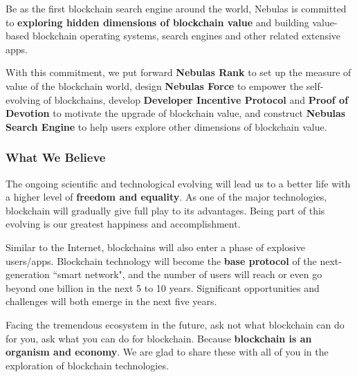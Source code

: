 Be as the first blockchain search engine around the world, Nebulas is committed to \textbf{exploring hidden dimensions of blockchain value} and building value-based blockchain operating systems, search engines and other related extensive apps.

With this commitment, we put forward \textbf{Nebulas Rank} to set up the measure of value of the blockchain world, design \textbf{Nebulas Force} to empower the self-evolving of blockchains, develop \textbf{Developer Incentive Protocol} and \textbf{Proof of Devotion} to motivate the upgrade of blockchain value, and construct \textbf{Nebulas Search Engine} to help users explore other dimensions of blockchain value.

\subsubsection*{What We Believe}

The ongoing scientific and technological evolving will lead us to a better life with a higher level of \textbf{freedom and equality}. As one of the major technologies, blockchain will gradually give full play to its advantages. Being part of this evolving is our greatest happiness and accomplishment.

Similar to the Internet, blockchains will also enter a phase of explosive users/apps. Blockchain technology will become the \textbf{base protocol} of the next-generation ``smart network", and the number of users will reach or even go beyond one billion in the next 5 to 10 years. Significant opportunities and challenges will both emerge in the next five years.

Facing the tremendous ecosystem in the future, ask not what blockchain can do for you, ask what you can do for blockchain. Because \textbf{blockchain is an organism and economy}. We are glad to share these with all of you in the exploration of blockchain technologies.